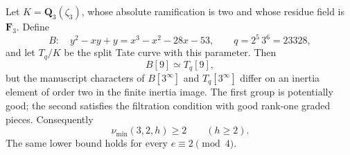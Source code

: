 \begin{proposition}[B-RD29: nine-torsion fails already at $p=3,e=2$]
\label{prop:B-RD29-p3-level-two}
Let $K=\mathbf Q_3(\zeta_3)$, whose absolute ramification is two
and whose residue field is $\mathbf F_3$. Define
\[
 B:\quad y^2-xy+y=x^3-x^2-28x-53,
 \qquad q=2^5\,3^6=23328,
\]
and let $T_q/K$ be the split Tate curve with this parameter.
Then
\[
 B[9]\simeq T_q[9],                                      \tag{B-RD29.2}
\]
but the manuscript characters of $B[3^\infty]$ and
$T_q[3^\infty]$ differ on an inertia element of order two in
the finite inertia image. The first group is potentially good;
the second satisfies the filtration condition with good rank-one
graded pieces. Consequently
\[
                 \nu_{\min}(3,2,h)\geq2\qquad(h\geq2).
                                                        \tag{B-RD29.3}
\]
The same lower bound holds for every $e\equiv2\pmod4$.
\end{proposition}

